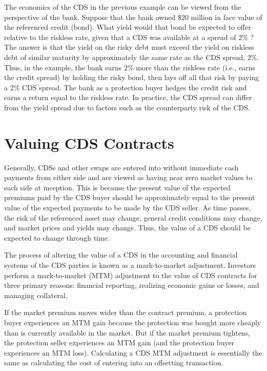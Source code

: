 \documentclass[11pt]{article}
\begin{document}
The economics of the CDS in the previous example can be viewed from the perspective of the bank. Suppose that the bank owned $\$ 20$ million in face value of the referenced credit (bond). What yield would that bond be expected to offer relative to the riskless rate, given that a CDS was available at a spread of $2 \%$ ? The answer is that the yield on the risky debt must exceed the yield on riskless debt of similar maturity by approximately the same rate as the CDS spread, $2 \%$. Thus, in the example, the bank earns $2 \%$ more than the riskless rate (i.e., earns the credit spread) by holding the risky bond, then lays off all that risk by paying a $2 \%$ CDS spread. The bank as a protection buyer hedges the credit risk and earns a return equal to the riskless rate. In practice, the CDS spread can differ from the yield spread due to factors such as the counterparty risk of the CDS.

\section*{Valuing CDS Contracts}
Generally, CDSs and other swaps are entered into without immediate cash payments from either side and are viewed as having near zero market values to each side at inception. This is because the present value of the expected premiums paid by the CDS buyer should be approximately equal to the present value of the expected payments to be made by the CDS seller. As time passes, the risk of the referenced asset may change, general credit conditions may change, and market prices and yields may change. Thus, the value of a CDS should be expected to change through time.

The process of altering the value of a CDS in the accounting and financial systems of the CDS parties is known as a mark-to-market adjustment. Investors perform a mark-to-market (MTM) adjustment to the value of CDS contracts for three primary reasons: financial reporting, realizing economic gains or losses, and managing collateral.

If the market premium moves wider than the contract premium, a protection buyer experiences an MTM gain because the protection was bought more cheaply than is currently available in the market. But if the market premium tightens, the protection seller experiences an MTM gain (and the protection buyer experiences an MTM loss). Calculating a CDS MTM adjustment is essentially the same as calculating the cost of entering into an offsetting transaction.
\end{document}
